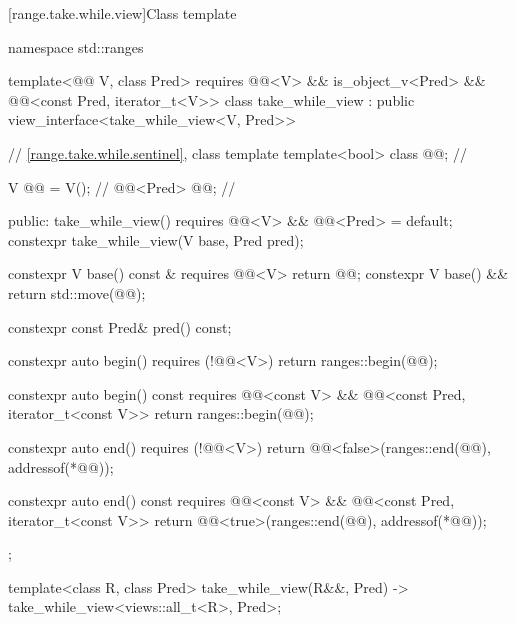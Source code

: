 [range.take.while.view]{Class template }

%
%
%
%
\begin{codeblock}
namespace std::ranges {
  template<@@ V, class Pred>
    requires @@<V> && is_object_v<Pred> &&
             @@<const Pred, iterator_t<V>>
  class take_while_view : public view_interface<take_while_view<V, Pred>> {
    // \ref{range.take.while.sentinel}, class template 
    template<bool> class @@;                      // \expos

    V @@ = V();                                      // \expos
    @@<Pred> @@;                            // \expos

  public:
    take_while_view() requires @@<V> && @@<Pred> = default;
    constexpr take_while_view(V base, Pred pred);

    constexpr V base() const & requires @@<V> { return @@; }
    constexpr V base() && { return std::move(@@); }

    constexpr const Pred& pred() const;

    constexpr auto begin() requires (!@@<V>)
    { return ranges::begin(@@); }

    constexpr auto begin() const
      requires @@<const V> &&
               @@<const Pred, iterator_t<const V>>
    { return ranges::begin(@@); }

    constexpr auto end() requires (!@@<V>)
    { return @@<false>(ranges::end(@@), addressof(*@@)); }

    constexpr auto end() const
      requires @@<const V> &&
               @@<const Pred, iterator_t<const V>>
    { return @@<true>(ranges::end(@@), addressof(*@@)); }
  };

  template<class R, class Pred>
    take_while_view(R&&, Pred) -> take_while_view<views::all_t<R>, Pred>;
}
\end{codeblock}

